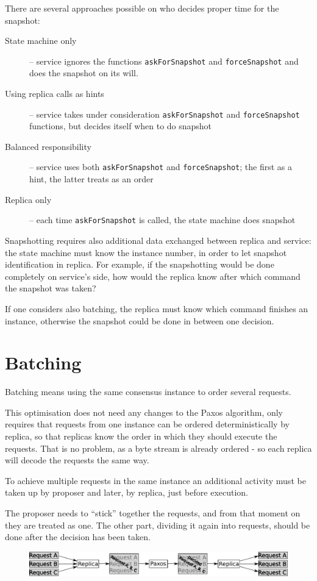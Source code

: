 There are several approaches possible on who decides proper time for the snapshot:
\begin{description} 
 \item[State machine only] -- service ignores the functions \texttt{askForSnapshot} and \texttt{forceSnapshot} and does the snapshot on its will.
 \item[Using replica calls as hints] -- service takes under consideration \texttt{askForSnapshot} and \texttt{fo\-rceSnapshot} functions, but decides itself when to do snapshot
 \item[Balanced responsibility] -- service uses both \texttt{askForSnapshot} and \texttt{forceSnapshot}; the first as a hint, the latter treats as an order
 \item[Replica only] -- each time \texttt{askForSnapshot} is called, the state machine does snapshot
\end{description}

Snapshotting requires also additional data exchanged between replica and service: the state machine must know the instance number, in order to let snapshot identification in replica. For example, if the snapshotting would be done completely on service's side, how would the replica know after which command the snapshot was taken?

If one considers also batching, the replica must know which command finishes an instance, otherwise the snapshot could be done in between one decision.

\section{Batching}
\label{sec:batching}
Batching means using the same consensus instance to order several requests.

This optimisation does not need any changes to the Paxos algorithm, only requires that requests from one instance can be ordered deterministically by replica, so that replicas know the order in which they should execute the requests. That is no problem, as a byte stream is already ordered - so each replica will decode the requests the same way.

To achieve multiple requests in the same instance an additional activity must be taken up by proposer and later, by replica, just before execution.

The proposer needs to ``stick'' together the requests, and from that moment on they are treated as one. The other part, dividing it again into requests, should be done after the decision has been taken.
\begin{figure}[h]
\includegraphics[keepaspectratio, width=\textwidth]{features/batching.pdf}
\end{figure}

